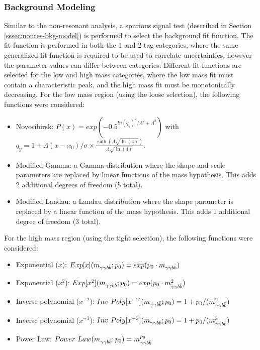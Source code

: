   


\subsubsection{Background Modeling} \label{sssec:res-bkg-model}

Similar to the non-resonant analysis, a spurious signal test (described in Section \ref{sssec:nonres-bkg-model}) is performed to select the background fit function. The fit function is performed in both the 1 and 2-tag categories, where the same generalized fit function is required to be used to correlate uncertainties, however the parameter values can differ between categories. Different fit functions are selected for the low and high mass categories, where the low mass fit must contain a characteristic peak, and the high mass fit must be monotonically decreasing. For the low mass region (using the loose selection), the following functions were considered:

\begin{itemize}
  \item Novosibirsk: $P(x) = exp(-0.5^{ln(q_y)^2 / \Lambda^2 + \Lambda^2})$ with $q_{y} = 1 + \Lambda(x-x_0)/\sigma \times \frac{\sinh(\Lambda \sqrt{\ln(4)})}{\Lambda \sqrt{\ln(4)}}$.
  \item Modified Gamma: a Gamma distribution where the shape and scale parameters are replaced by linear functions of the mass hypothesis. This adds 2 additional degrees of freedom (5 total).
  \item Modified Landau: a Landau distribution where the shape parameter is replaced by a linear function of the mass hypothesis. This adds 1 additional degree of freedom (3 total).
\end{itemize}


For the high mass region (using the tight selection), the following functions were considered:
\begin{itemize}
  \item Exponential ($x$): $Exp[x](m_{\gamma\gamma b\bar{b}};p_0) = exp(p_0 \cdot m_{\gamma\gamma b\bar{b}})$
  \item Exponential ($x^2$): $Exp[x^2](m_{\gamma\gamma b\bar{b}};p_0) = exp(p_0 \cdot m_{\gamma\gamma b\bar{b}}^{2})$
  \item Inverse polynomial ($x^{-2}$): $Inv\ Poly [x^{-2}](m_{\gamma\gamma b\bar{b}};p_0) = 1 +p_0/(m_{\gamma\gamma b\bar{b}}^{2})$
  \item Inverse polynomial ($x^{-3}$): $Inv\ Poly [x^{-3}](m_{\gamma\gamma b\bar{b}};p_0) = 1 +p_0/(m_{\gamma\gamma b\bar{b}}^{3})$
  \item Power Law: $Power\ Law(m_{\gamma\gamma b\bar{b}};p_0) = m_{\gamma\gamma b\bar{b}}^{p_0}$
\end{itemize}

